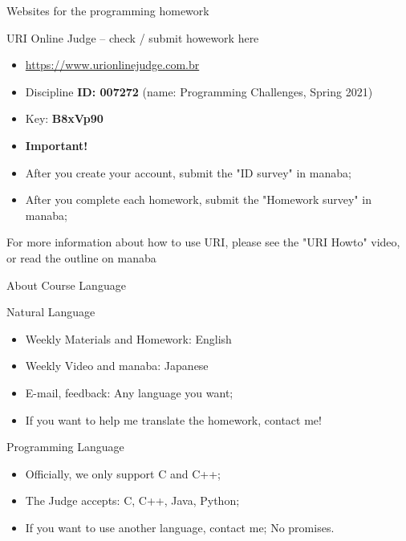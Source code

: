 \begin{frame}{Websites for the programming homework}
  \begin{block}{URI Online Judge -- check / submit howework here}
    \begin{itemize}
      \item \url{https://www.urionlinejudge.com.br}
      \item Discipline {\bf ID: 007272} (name: Programming Challenges, Spring 2021)
      \item Key: {\bf B8xVp90}
      \bigskip

      \item {\bf Important!}
      \item After you create your account, submit the "ID survey" in manaba;
      \item After you complete each homework, submit the "Homework survey" in manaba;
    \end{itemize}
  \end{block}
  For more information about how to use URI, please see the "URI Howto" video, or read the outline on manaba
\end{frame}

\begin{frame}{About Course Language}
  \begin{block}{Natural Language}
    \begin{itemize}
      \item Weekly Materials and Homework: English
      \item Weekly Video and manaba: Japanese
      \item E-mail, feedback: Any language you want;
      \item If you want to help me translate the homework, contact me!
    \end{itemize}
  \end{block}

  \begin{block}{Programming Language}
    \begin{itemize}
      \item Officially, we only support C and C++;
      \item The Judge accepts: C, C++, Java, Python;
      \item If you want to use another language, contact me; No promises.
    \end{itemize}
  \end{block}
\end{frame}

